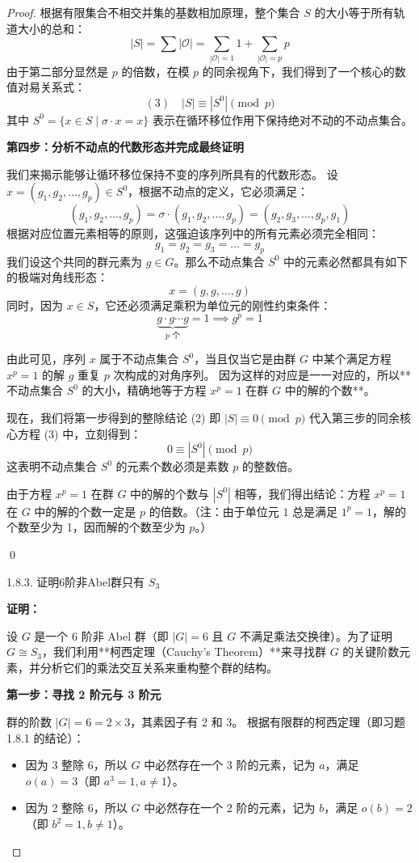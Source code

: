 \documentclass[]{article}
\begin{document}
\begin{proof}
根据有限集合不相交并集的基数相加原理，整个集合 $S$ 的大小等于所有轨道大小的总和：
\[ |S| = \sum |\mathcal{O}| = \sum_{|\mathcal{O}|=1} 1 + \sum_{|\mathcal{O}|=p} p \]
由于第二部分显然是 $p$ 的倍数，在模 $p$ 的同余视角下，我们得到了一个核心的数值对易关系式：
\[ (3) \quad |S| \equiv |S^0| \pmod p \]
其中 $S^0 = \{ x \in S \mid \sigma \cdot x = x \}$ 表示在循环移位作用下保持绝对不动的不动点集合。

\bigskip
\noindent \textbf{第四步：分析不动点的代数形态并完成最终证明}

我们来揭示能够让循环移位保持不变的序列所具有的代数形态。
设 $x = (g_1, g_2, \dots, g_p) \in S^0$，根据不动点的定义，它必须满足：
\[ (g_1, g_2, \dots, g_p) = \sigma \cdot (g_1, g_2, \dots, g_p) = (g_2, g_3, \dots, g_p, g_1) \]
根据对应位置元素相等的原则，这强迫该序列中的所有元素必须完全相同：
\[ g_1 = g_2 = g_3 = \dots = g_p \]
我们设这个共同的群元素为 $g \in G$。那么不动点集合 $S^0$ 中的元素必然都具有如下的极端对角线形态：
\[ x = (g, g, \dots, g) \]
同时，因为 $x \in S$，它还必须满足乘积为单位元的刚性约束条件：
\[ \underbrace{g \cdot g \cdots g}_{p \text{ 个}} = 1 \implies g^p = 1 \]

由此可见，序列 $x$ 属于不动点集合 $S^0$，当且仅当它是由群 $G$ 中某个满足方程 $x^p = 1$ 的解 $g$ 重复 $p$ 次构成的对角序列。
因为这样的对应是一一对应的，所以**不动点集合 $S^0$ 的大小，精确地等于方程 $x^p = 1$ 在群 $G$ 中的解的个数**。

现在，我们将第一步得到的整除结论 (2) 即 $|S| \equiv 0 \pmod p$ 代入第三步的同余核心方程 (3) 中，立刻得到：
\[ 0 \equiv |S^0| \pmod p \]
这表明不动点集合 $S^0$ 的元素个数必须是素数 $p$ 的整数倍。

由于方程 $x^p = 1$ 在群 $G$ 中的解的个数与 $|S^0|$ 相等，我们得出结论：方程 $x^p = 1$ 在 $G$ 中的解的个数一定是 $p$ 的倍数。（注：由于单位元 $1$ 总是满足 $1^p = 1$，解的个数至少为 1，因而解的个数至少为 $p$。）

\qed

1.8.3. 证明6阶非Abel群只有 $S_{3}$ 

\bigskip
\noindent \textbf{证明：} 

设 $G$ 是一个 6 阶非 Abel 群（即 $|G| = 6$ 且 $G$ 不满足乘法交换律）。为了证明 $G \cong S_3$，我们利用**柯西定理（Cauchy's Theorem）**来寻找群 $G$ 的关键阶数元素，并分析它们的乘法交互关系来重构整个群的结构。

\bigskip
\noindent \textbf{第一步：寻找 2 阶元与 3 阶元}

群的阶数 $|G| = 6 = 2 \times 3$，其素因子有 2 和 3。
根据有限群的柯西定理（即习题 1.8.1 的结论）：
\begin{itemize}
	\item 因为 3 整除 6，所以 $G$ 中必然存在一个 3 阶的元素，记为 $a$，满足 $o(a) = 3$（即 $a^3 = 1, a \neq 1$）。
	\item 因为 2 整除 6，所以 $G$ 中必然存在一个 2 阶的元素，记为 $b$，满足 $o(b) = 2$（即 $b^2 = 1, b \neq 1$）。
\end{itemize}


\end{proof}
\end{document}
